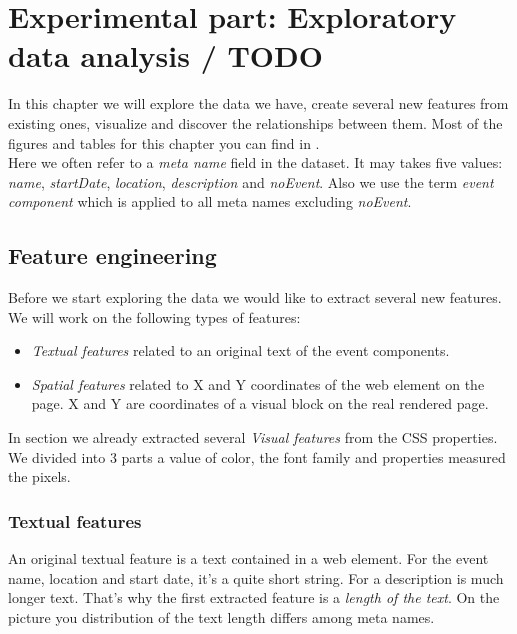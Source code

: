 \chapter{Experimental part: Exploratory data analysis / TODO}
\label{chap:dataexplore}
In this chapter we will explore the data we have, create several new features from existing ones, visualize and discover the relationships between them. Most of the figures and tables for this chapter you can find in .\\

Here we often refer to a \textit{meta name} field in the dataset. It may takes five values: \textit{name}, \textit{startDate}, \textit{location}, \textit{description} and \textit{noEvent}. Also we use the term \textit{event component} which is applied to all meta names excluding \textit{noEvent}.


\section{Feature engineering}
Before we start exploring the data we would like to extract several new features. We will work on the following types of features: 

\begin{itemize}
\item \textit{Textual features} related to an original text of the event components.
\item \textit{Spatial features} related to X and Y coordinates of the web element on the page. X and Y are coordinates of a visual block on the real rendered page. 
\end{itemize}

In section  we already extracted several \textit{Visual features} from the CSS properties. We divided into 3 parts a value of color, the font family and properties measured the pixels. 

\subsection{Textual features}

An original textual feature is a text contained in a web element. For the event name, location and start date, it's a quite short string. For a description is much longer text. That's why the first extracted feature is a \textit{length of the text}. On the picture  you distribution of the text length differs among meta names. \\

